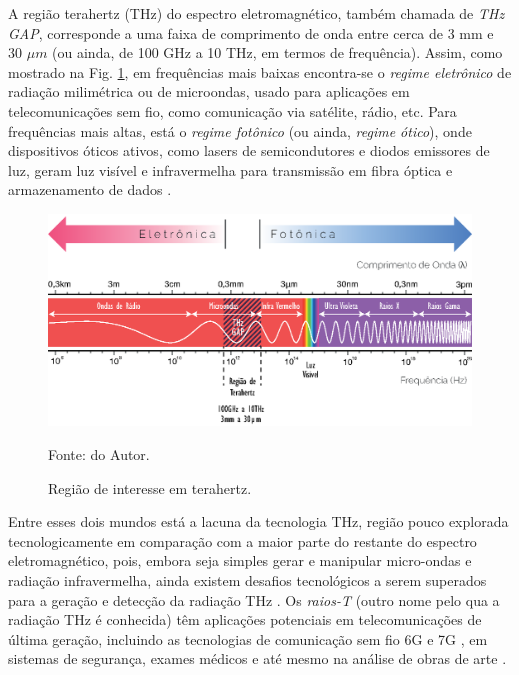 A região terahertz (THz) do espectro eletromagnético, também chamada de \textit{THz GAP}, corresponde a uma faixa de comprimento de onda entre cerca de 3 mm e 30 $\mu m$ (ou ainda, de 100 GHz a 10 THz, em termos de frequência). Assim, como mostrado na Fig. \ref{fig: Therahertz}, em frequências mais baixas encontra-se o \textit{regime eletrônico} de radiação milimétrica ou de microondas, usado para aplicações em telecomunicações sem fio, como comunicação via satélite, rádio, etc. Para frequências mais altas, está o \textit{regime fotônico} (ou ainda, \textit{regime ótico}), onde dispositivos óticos ativos, como lasers de semicondutores e diodos emissores de luz, geram luz visível e infravermelha para transmissão em fibra óptica e armazenamento de dados \cite{ghann2017terahertz,fukunaga2009terahertz}.

\begin{figure}[H]
    \centering
    \includegraphics{04-Figuras/Therahertz.eps}
    \caption{Região de interesse em terahertz.} \par
    Fonte: do Autor.
    \label{fig: Therahertz}
\end{figure}

Entre esses dois mundos está a lacuna da tecnologia THz, região pouco explorada tecnologicamente em comparação com a maior parte do restante do espectro eletromagnético, pois, embora seja simples gerar e manipular micro-ondas e radiação infravermelha, ainda existem desafios tecnológicos a serem superados para a geração e detecção da radiação THz \cite{zhang2010introduction}. Os \textit{raios-T} (outro nome pelo qua a radiação THz é conhecida) têm aplicações potenciais em telecomunicações de última geração, incluindo as tecnologias de comunicação sem fio 6G e 7G \cite{Yang2020VisionOf6G}, em sistemas de segurança, exames médicos e até mesmo na análise de obras de arte \cite{fukunaga2007terahertz,fukunaga2009terahertz}.

